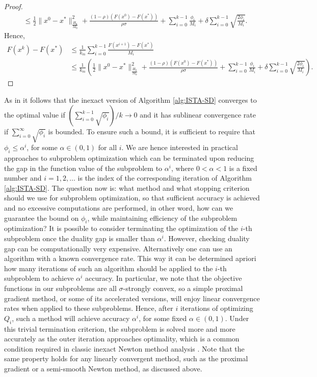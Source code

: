 \documentclass[11pt]{article}
\numberwithin{equation}{section}
\begin{document}
\begin{proof}
\begin{align}
        \nonumber &\leq 
        \frac{1}{2} \|x^0-x^*\|_{\frac{H_0}{M_0}}^2 
        + \frac{(1-\rho)(F(x^0)-F(x^*))}{\rho\sigma} 
        + \sum_{i=0}^{k-1}\frac{\phi_i}{M_i}
        + \delta\sum_{i=0}^{k-1} \sqrt{\frac{2\phi_i}{M_i}}.
    \end{align}
    Hence,
    \begin{align*}
        F(x^k) - F(x^*) &\leq \frac{1}{k_m}\sum_{i=0}^{k-1} \frac{F(x^{i+1}) - F(x^*)}{M_i}\\        
        &\leq \frac{1}{k_m} \left( \frac{1}{2} \|x^0-x^*\|_{\frac{H_0}{M_0}}^2 
        + \frac{(1-\rho)(F(x^0)-F(x^*))}{\rho\sigma} 
        + \sum_{i=0}^{k-1}\frac{\phi_i}{M_i}
        + \delta\sum_{i=0}^{k-1} \sqrt{\frac{2\phi_i}{M_i}} \right).
    \end{align*}
\end{proof}


As in  \cite{Schmidtetal}  it follows that the inexact version of Algorithm \ref{alg:ISTA-SD} converges  to the optimal value if $(\sum_{i=0}^{k-1} \sqrt{\phi_i})/k \to 0$ and it has sublinear convergence rate if $\sum_{i=0}^{\infty} \sqrt{\phi_i}$ is  bounded.
To ensure such a  bound, it is sufficient to require that  $\phi_i\leq \alpha^i$, for some $\alpha\in (0,1)$ for all $i$. We are hence interested in practical approaches to subproblem optimization which can be terminated upon reducing the gap in the function value of the subproblem to $\alpha^i$, where $0<\alpha<1$ is a fixed number and  $i=1, 2, \ldots$ is the  index of the corresponding iteration of  Algorithm \ref{alg:ISTA-SD}. 
The question now is: what method and what stopping criterion should we use for subproblem optimization, so that sufficient accuracy is achieved and no excessive computations are performed, in other word, how can we guarantee the bound on $\phi_i$,  while maintaining efficiency of the subproblem optimization? It is possible to consider terminating
 the optimization of the $i$-th subproblem once the duality gap is smaller than $\alpha^i$.  However, checking duality gap can be computationally  very expensive. 
 Alternatively one can use an algorithm with a known  convergence rate. This way it can be determined apriori how many iterations of such an algorithm should be applied to the $i$-th subproblem to achieve $\alpha^i$ accuracy. In particular, we note that the objective functions in our subproblems  are all $\sigma$-strongly convex, so a simple proximal gradient method, or some of its accelerated versions,  will enjoy linear convergence rates when applied to these subproblems.  Hence, after $i$ iterations of optimizing
  $Q_i$,  such a method will achieve accuracy $\alpha^i$, for some fixed $\alpha\in (0,1)$.  Under this trivial termination criterion,  the subproblem is solved more and more accurately as the outer iteration approaches optimality, which is a common condition required in classic inexact Newton method analysis \cite{DemboEisenstatSteihaug1982}. 
Note that the same property holds for any linearly convergent  method, such as the proximal gradient or a semi-smooth Newton method, as discussed  above. 
\end{document}
